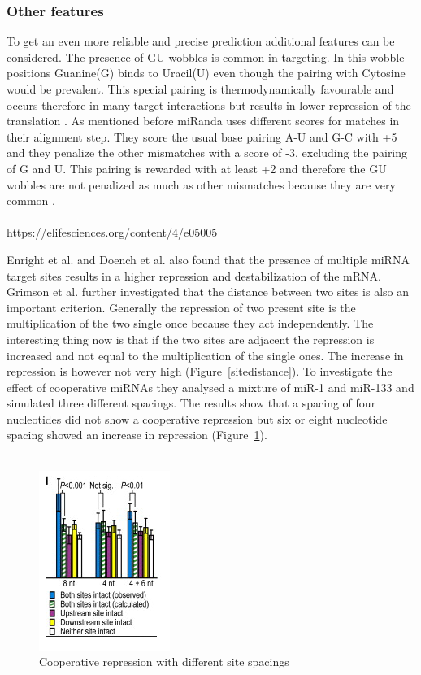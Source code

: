\documentclass[12pt]{article}
\begin{document}
\vspace{1cm}


\subsubsection{Other features}
To get an even more reliable and precise prediction additional features can be considered. The presence of GU-wobbles is common in targeting. In this wobble positions Guanine(G) binds to Uracil(U) even though the pairing with Cytosine would be prevalent. This special pairing is thermodynamically favourable and occurs therefore in many target interactions but results in lower repression of the translation \cite{Doench}. As mentioned before miRanda uses different scores for matches in their alignment step. They score the usual base pairing A-U and G-C with +5 and they penalize the other mismatches with a score of -3, excluding the pairing of G and U. This pairing is rewarded with at least +2 and therefore the GU wobbles are not penalized as much as other mismatches because they are very common \cite{Enright}.\\\\
 
https://elifesciences.org/content/4/e05005

Enright et al. \cite{Enright} and Doench et al. \cite{Doench} also found that the presence of multiple miRNA target sites results in a higher repression and destabilization of the mRNA. Grimson et al. \cite{Grimson} further investigated that the distance between two sites is also an important criterion. Generally the repression of two present site is the multiplication of the two single once because they act independently. The interesting thing now is that if the two sites are adjacent the repression is increased and not equal to the multiplication of the single ones. The increase in repression is however not very high (Figure~\ref{sitedistance}). To investigate the effect of cooperative miRNAs they analysed a mixture of miR-1 and miR-133 and simulated three different spacings. The results show that a spacing of four nucleotides did not show a cooperative repression but six or eight nucleotide spacing showed an increase in repression (Figure~\ref{sitespacing}).\\\\

\begin{figure}[h]
\centering
\includegraphics[scale=1]{results/sites_8nt.PNG}  
\caption{Cooperative repression with different site spacings}
\label{sitespacing}
\end{figure}
\end{document}
